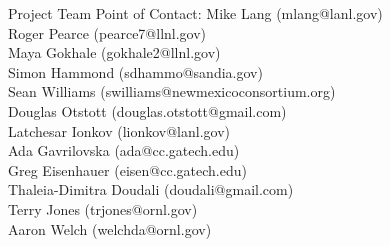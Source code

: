 \documentclass[final,hyperref={pdfpagelabels=false}]{beamer}
\begin{document}
\begin{frame}{}
\begin{columns}[t]
\begin{column}{.45\linewidth}
    \begin{block}{Project Team}
      Point of Contact: Mike Lang (mlang@lanl.gov) \\
      Roger Pearce (pearce7@llnl.gov) \\
      Maya Gokhale (gokhale2@llnl.gov) \\
      Simon Hammond (sdhammo@sandia.gov) \\
      Sean Williams (swilliams@newmexicoconsortium.org) \\
      Douglas Otstott (douglas.otstott@gmail.com) \\
      Latchesar Ionkov (lionkov@lanl.gov) \\
      Ada Gavrilovska (ada@cc.gatech.edu) \\
      Greg Eisenhauer (eisen@cc.gatech.edu) \\
      Thaleia-Dimitra Doudali (doudali@gmail.com) \\
      Terry Jones (trjones@ornl.gov) \\
       Aaron Welch (welchda@ornl.gov)
    \end{block}
  \end{column}
  

\end{columns}
\end{frame}
\end{document}
